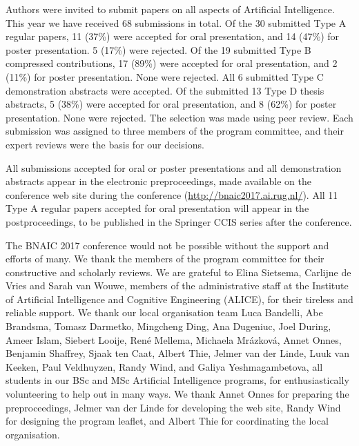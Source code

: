 \noindent Authors were invited to submit papers on all aspects of Artificial Intelligence. This year we have received 68 submissions in total. Of the 30 submitted Type A regular papers, 11 (37\%) were accepted for oral presentation, and 14 (47\%) for poster presentation. 5 (17\%) were rejected. Of the 19 submitted Type B compressed contributions, 17 (89\%) were accepted for oral presentation, and 2 (11\%) for poster presentation. None were rejected. All 6 submitted Type C demonstration abstracts were accepted. Of the submitted 13 Type D thesis abstracts, 5 (38\%) were accepted for oral presentation, and 8 (62\%) for poster presentation. None were rejected. The selection was made using peer review. Each submission was assigned to three members of the program committee, and their expert reviews were the basis for our decisions. 

All submissions accepted for oral or poster presentations and all demonstration abstracts appear in the electronic preproceedings, made available on the conference web site during the conference (\url{http://bnaic2017.ai.rug.nl/}). All 11 Type A regular papers accepted for oral presentation will appear in the postproceedings, to be published in the Springer CCIS series after the conference.

The BNAIC 2017 conference would not be possible without the support and efforts of many. We thank the members of the program committee for their constructive and scholarly reviews. We are grateful to 
    Elina Sietsema, Carlijne de Vries and 
		Sarah van Wouwe, members of the administrative staff at the Institute of Artificial Intelligence and Cognitive Engineering (ALICE), for their tireless and reliable support. We thank our local organisation team 
		Luca Bandelli,
    Abe Brandsma,
    Tomasz Darmetko,
    Mingcheng Ding,
    Ana Dugeniuc,
    Joel During,
    Ameer Islam,
    Siebert Looije,
    Ren\'{e} Mellema,
    Michaela Mr\'{a}zkov\'{a},
    Annet Onnes,
    Benjamin Shaffrey,
    Sjaak ten Caat,
    Albert Thie,
    Jelmer van der Linde,
    Luuk van Keeken,
    Paul Veldhuyzen,
    Randy Wind, and
    Galiya Yeshmagambetova, 
all students in our BSc and MSc Artificial Intelligence programs, for enthusiastically volunteering to help out in many ways. We thank Annet Onnes for preparing the preproceedings, Jelmer van der Linde for developing the web site, Randy Wind for designing the program leaflet, and Albert Thie for coordinating the local organisation.
		
